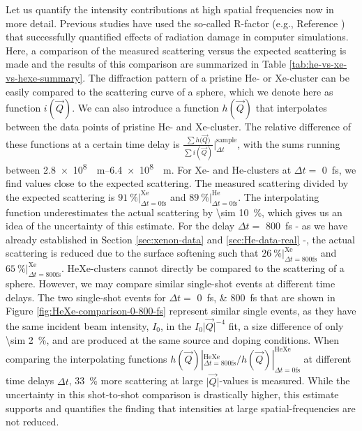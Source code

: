 Let us quantify the intensity contributions at high spatial frequencies now in more detail. Previous studies have used the so-called R-factor (e.g., Reference \cite{Neutze-2000-Nature,Hau-Riege-2008-PRE}) that successfully quantified effects of radiation damage in computer simulations. Here, a comparison of the measured scattering versus the expected scattering is made and the results of this comparison are summarized in Table \ref{tab:he-vs-xe-vs-hexe-summary}. The diffraction pattern of a pristine He- or Xe-cluster can be easily compared to the scattering curve of a sphere, which we denote here as function $i(\vec{Q})$. We can also introduce a function $h(\vec{Q})$ that interpolates between the data points of pristine He- and Xe-cluster. The relative difference of these functions at a certain time delay is $\tfrac{\sum{h(\vec{Q}})}{\sum{i(\vec{Q})}}|_{\Delta t}^{\text{sample}}$, with the sums running between \SIrange[scientific-notation = fixed, fixed-exponent = 8]{2.8e8}{6.4e8}{\per\meter}. For Xe- and He-clusters at $\Delta t =$ \SI{0}{\femto\second}, we find values close to the expected scattering. The measured scattering divided by the expected scattering is $\SI{91}{\percent} |_{\Delta t = 0 \text{fs}}^{\text{Xe}}$ and $\SI{89}{\percent}|_{\Delta t=0 \text{fs}}^{\text{He}}$. The interpolating function underestimates the actual scattering by \SI{\sim 10}{\percent}, which gives us an idea of the uncertainty of this estimate. For the delay $\Delta t=$ \SI{800}{\femto\second} - as we have already established in Section \ref{sec:xenon-data} and \ref{sec:He-data-real} -, the actual scattering is reduced due to the surface softening such that $\SI{26}{\percent} |_{\Delta t = 800 \text{fs}}^{\text{Xe}}$ and $\SI{65}{\percent} |_{\Delta t = 800 \text{fs}}^{\text{Xe}}$. HeXe-clusters cannot directly be compared to the scattering of a sphere. However, we may compare similar single-shot events at different time delays. The two single-shot events for $\Delta t=$ \SIlist{0;800}{\femto\second} that are shown in Figure \ref{fig:HeXe-comparison-0-800-fs} represent similar single events, as they have the same incident beam intensity, $I_{0}$, in the $I_{0} \lvert\vec{Q}\rvert^{-4}$ fit, a size difference of only \SI{\sim 2}{\percent}, and are produced at the same source and doping conditions. When comparing the interpolating functions $h(\vec{Q}) |_{\Delta t = 800 \text{fs}}^{\text{HeXe}}/h(\vec{Q}) |_{\Delta t = 0 \text{fs}}^{\text{HeXe}}$ at different time delays $\Delta t$, \SI{33}{\percent} more scattering at large $\lvert\vec{Q}\rvert$-values is measured. While the uncertainty in this shot-to-shot comparison is drastically higher, this estimate supports and quantifies the finding that intensities at large spatial-frequencies are not reduced.\\[1\baselineskip] 
